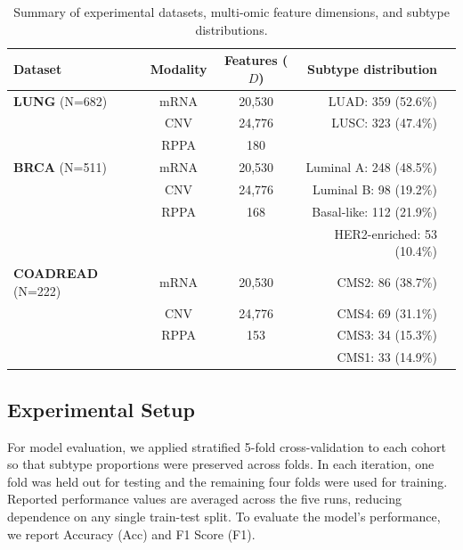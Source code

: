\documentclass[lettersize,journal]{IEEEtran}
\begin{document}
\begin{table}[htbp]
\centering
\caption{Summary of experimental datasets, multi-omic feature dimensions, and subtype distributions.}
\label{tab:dataset_summary}
\small
\begin{tabular}{@{}lccrX@{}}
\toprule
\textbf{Dataset} & \textbf{Modality} & \textbf{Features ($D$)} & \textbf{Subtype distribution} \\ 
\midrule
\textbf{LUNG} (N=682) & mRNA & 20,530 & LUAD: 359 (52.6\%) \\
 &  CNV & 24,776 & LUSC: 323 (47.4\%) \\
 &  RPPA & 180 &  \\ 
\midrule


\textbf{BRCA} (N=511) & mRNA & 20,530 & Luminal A: 248 (48.5\%) \\
 & CNV & 24,776 & Luminal B: 98 (19.2\%) \\
 & RPPA & 168 & Basal-like: 112 (21.9\%) \\
 & & & HER2-enriched: 53 (10.4\%) \\
 
\midrule
\textbf{COADREAD} (N=222) & mRNA & 20,530 & CMS2: 86 (38.7\%)\\
 & CNV & 24,776 & CMS4: 69 (31.1\%)\\
 & RPPA & 153 & CMS3: 34 (15.3\%) \\ 
 &  &  & CMS1: 33 (14.9\%) \\ 

\bottomrule
\end{tabular}
\end{table}

\subsection{Experimental Setup}
For model evaluation, we applied stratified 5-fold cross-validation to each cohort so that subtype proportions were preserved across folds. In each iteration, one fold was held out for testing and the remaining four folds were used for training. Reported performance values are averaged across the five runs, reducing dependence on any single train-test split. To evaluate the model’s performance, we report Accuracy (Acc) and F1 Score (F1).
\end{document}
